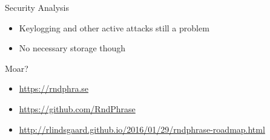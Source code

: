 \documentclass{beamer}
\begin{document}
\begin{frame}{Security Analysis}
  \begin{itemize}
    \item Keylogging and other active attacks still a problem
    \item No necessary storage though
  \end{itemize}
\end{frame}

\begin{frame}{Moar?}
  \begin{itemize}
    \item \url{https://rndphra.se}
    \item \url{https://github.com/RndPhrase}
    \item \url{http://rlindsgaard.github.io/2016/01/29/rndphrase-roadmap.html}
  \end{itemize}
\end{frame}
\end{document}
